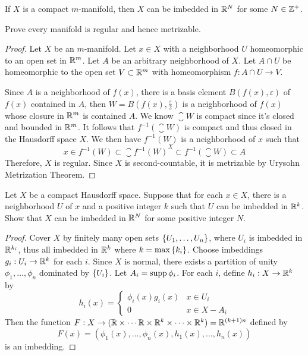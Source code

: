 \documentclass[12pt,a4paper]{article}
\begin{document}
    \begin{thm}
        If $X$ is a compact $m$-manifold, then $X$ can be imbedded in $\mathbb{R}^N$ for some $N\in\mathbb{Z}^+$.
    \end{thm}
    \hfill

    \begin{ex}
        Prove every manifold is regular and hence metrizable.
    \end{ex}
    \begin{proof}
        Let $X$ be an $m$-manifold. Let $x\in X$ with a neighborhood $U$ homeomorphic to an open set in $\mathbb{R}^m$. Let $A$ be an arbitrary neighborhood of $X$. Let $A\cap U$ be homeomorphic to the open set $V\subset \mathbb{R}^m$ with homeomorphism $f:A\cap U\to V$.
        
        Since $A$ is a neighborhood of $f(x)$, there is a basis element $B(f(x),\varepsilon)$ of $f(x)$ contained in $A$, then $W=B(f(x),\frac{\varepsilon}{2})$ is a neighborhood of $f(x)$ whose closure in $\mathbb{R}^m$ is contained $A$. We know $\closure{W}$ is compact since it's closed and bounded in $\mathbb{R}^m$. It follows that $f^{-1}(\closure{W})$ is compact and thus closed in the Hausdorff space $X$. We then have $f^{-1}(W)$ is a neighborhood of $x$ such that
        $$
        x\in f^{-1}(W)\subset\closure{f^{-1}(W)}^{X}\subset f^{-1}(\closure{W})\subset A
        $$
        Therefore, $X$ is regular. Since $X$ is second-countable, it is metrizable by Urysohn Metrization Theorem.
    \end{proof}
    \hfill

    \begin{ex}
        Let $X$ be a compact Hausdorff space. Suppose that for each $x\in X$, there is a neighborhood $U$ of $x$ and a positive integer $k$ such that $U$ can be imbedded in $\mathbb{R}^k$. Show that $X$ can be imbedded in $\mathbb{R}^N$ for some positive integer $N$.
    \end{ex}
    \begin{proof}
        Cover $X$ by finitely many open sets $\left\{U_1,\dots,U_n\right\}$, where $U_i$ is imbedded in $\mathbb{R}^{k_i}$, thus all imbedded in $\mathbb{R}^k$ where $k=\max\left\{k_i\right\}$. Choose imbeddings $g_i:U_i\to\mathbb{R}^k$ for each $i$. Since $X$ is normal, there exists a partition of unity $\phi_1,\dots,\phi_n$ dominated by $\left\{U_i\right\}$. Let $A_i=\operatorname{supp}\phi_i$. For each $i$, define $h_i:X\to \mathbb{R}^k$ by
        $$
        h_i(x)=\begin{cases}
            \phi_i(x)g_i(x)&x\in U_i\\0&x\in X-A_i
        \end{cases}
        $$
        Then the function $F:X\to (\mathbb{R}\times\cdots\mathbb{R}\times\mathbb{R}^k\times\cdots\times\mathbb{R}^k)=\mathbb{R}^{(k+1)n}$ defined by 
        $$
        F(x)=(\phi_1(x),\dots,\phi_n(x),h_1(x),\dots,h_n(x))
        $$
        is an imbedding.
    \end{proof}
    \hfill
\end{document}
